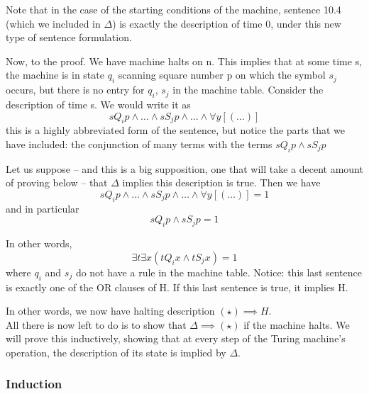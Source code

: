 Note that in the case of the starting conditions of the machine, sentence 10.4 (which we included in $\Delta$) is exactly the description of time 0, under this new type of sentence formulation.




Now, to the proof.
We have machine halts on n.
This implies that at some time s, the machine is in state $q_i$ scanning square number p on which the symbol $s_j$ occurs, but there is no entry for $q_i$, $s_j$ in the machine table.
Consider the description of time s. We would write it as 
\[sQ_ip \land \dots \land sS_jp \land \dots \land \forall y [(\dots)]\]
this is a highly abbreviated form of the sentence, but notice the parts that we have included:
	the conjunction of many terms with the terms
	$sQ_ip \land sS_jp$

Let us suppose -- and this is a big supposition, one that will take a decent amount of proving below -- that $\Delta$ implies this description is true. Then we have 
\[sQ_ip \land \dots \land sS_jp \land \dots \land \forall y [(\dots)] = 1 \tag{$\star$}\]
and in particular
\[sQ_ip \land sS_jp = 1\]

In other words, 
\[\exists t \exists x (tQ_ix \land tS_jx) = 1\]
where $q_i$ and $s_j$ do not have a rule in the machine table.
Notice: this last sentence is exactly one of the OR clauses of H. If this last sentence is true, it implies H.

In other words, we now have 
halting description $(\star)\implies H$.\\
All there is now left to do is to show that $\Delta \implies (\star)$ if the machine halts.
We will prove this inductively, showing that at every step of the Turing machine's operation, the description of its state is implied by $\Delta$.


\subsubsection{Induction}
